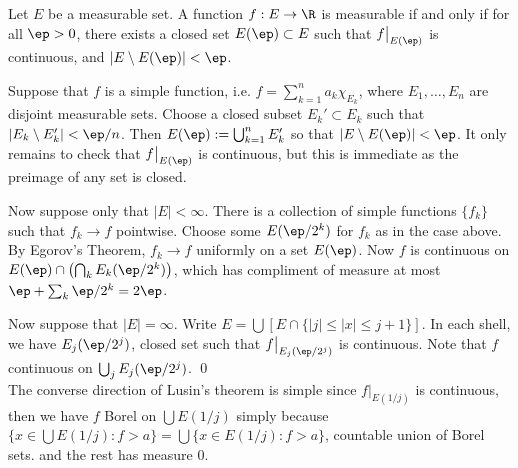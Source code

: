 




\begin{thm}
Let $E$ be a measurable set. A function $f: E \to \R$ is measurable if and only if for all $\ep>0$, there exists a closed set $E(\ep) \subset E$ such that $f\big|_{E(\ep)}$ is continuous, and $|E\setminus E(\ep)|<\ep$.
\end{thm}

\pf Suppose that $f$ is a simple function, i.e. $f= \sum_{k=1}^n a_k \chi_{E_k}$, where $E_1,\ldots,E_n$ are disjoint measurable sets. Choose a closed subset $E_k' \subset E_k$ such that $|E_k \setminus E_k'| < \ep/n$. Then $E(\ep):= \bigcup_{k=1}^n E_k'$ so that $|E\setminus E(\ep)|<\ep$. It only remains to check that $f\big|_{E(\ep)}$ is continuous, but this is immediate as the preimage of any set is closed.  


Now suppose only that $|E|<\infty$. There is a collection of simple functions $\{f_k\}$ such that $f_k \to f$ pointwise. Choose some $E(\ep/2^k)$ for $f_k$ as in the case above. By Egorov's Theorem, $f_k \to f$ uniformly on a set $E(\ep)$. Now $f$ is continuous on $E(\ep) \cap \left(\bigcap_k E_k(\ep/2^k)\right)$, which has compliment of measure at most $\ep+ \sum_k \ep/2^k=2\ep$. 


Now suppose that $|E|=\infty$. Write $E= \bigcup \left[ E \cap \{ |j| \leq |x| \leq j+1\}\right]$. In each shell, we have $E_j(\ep/2^j)$, closed set such that $f\big|_{E_j(\ep/2^j)}$ is continuous. Note that $f$ continuous on $\bigcup_j E_j(\ep/2^j)$. \qed \\




The converse direction of Lusin's theorem is simple since $f\big|_{E(1/j)}$ is continuous, then we have $f$ Borel on $\bigcup E(1/j)$ simply because $\{x \in \bigcup E(1/j) \colon f>a \}= \bigcup \{x \in E(1/j) \colon f>a\}$, countable union of Borel sets. and the rest has measure 0. 






